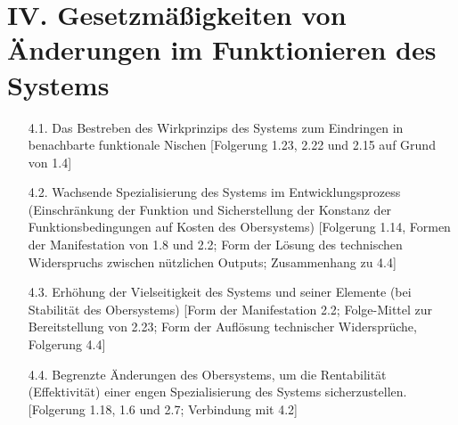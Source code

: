 \documentclass[11pt,a4paper]{article}
\begin{document}
\section*{IV. Gesetzmäßigkeiten von Änderungen im Funktionieren des Systems}
\begin{itemize}
\item[4.1.] Das Bestreben des Wirkprinzips des Systems zum Eindringen in
  benachbarte funktionale Nischen [Folgerung 1.23, 2.22 und 2.15 auf Grund von
    1.4]
\item[4.2.] Wachsende Spezialisierung des Systems im Entwicklungsprozess
  (Einschränkung der Funktion und Sicherstellung der Konstanz der
  Funktionsbedingungen auf Kosten des Obersystems) [Folgerung 1.14, Formen der
    Manifestation von 1.8 und 2.2; Form der Lösung des technischen
    Widerspruchs zwischen nützlichen Outputs; Zusammenhang zu 4.4]
\item[4.3.] Erhöhung der Vielseitigkeit des Systems und seiner Elemente (bei
  Stabilität des Obersystems) [Form der Manifestation 2.2; Folge-Mittel zur
    Bereitstellung von 2.23; Form der Auflösung technischer Widersprüche,
    Folgerung 4.4]
\item[4.4.] Begrenzte Änderungen des Obersystems, um die Rentabilität
  (Effektivität) einer engen Spezialisierung des Systems sicherzustellen.
  [Folgerung 1.18, 1.6 und 2.7; Verbindung mit 4.2]
\end{itemize}
\end{document}
